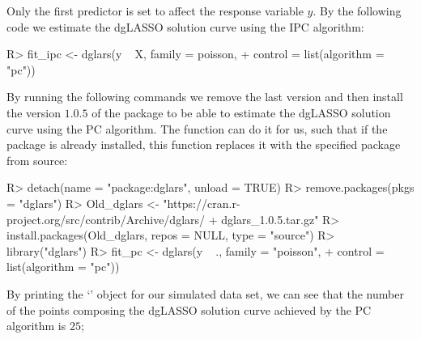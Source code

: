 
Only the first predictor is set to affect the response variable $y$. By the following code we estimate the dgLASSO solution curve using the IPC algorithm:

\begin{example}
R> fit_ipc <- dglars(y ~ X, family = poisson, 
+                    control = list(algorithm =  "pc"))
\end{example}

By running the following commands we remove the last version and then install the version $1.0.5$ of the package to be able to estimate the dgLASSO solution curve using the PC algorithm. The function  can do it for us, such that if the package is already installed, this function replaces it with the specified package from source:


\begin{example}
R> detach(name = "package:dglars", unload = TRUE)
R> remove.packages(pkgs = "dglars")
R> Old_dglars <- "https://cran.r-project.org/src/contrib/Archive/dglars/
+                dglars_1.0.5.tar.gz"
R> install.packages(Old_dglars, repos = NULL, type = "source")
R> library("dglars")
R> fit_pc <- dglars(y ~ ., family = "poisson", 
+                   control =  list(algorithm = "pc"))
\end{example}

By printing the `' object  for our simulated data set, we can see that the number of the points composing the dgLASSO solution curve achieved by the PC algorithm is $25$;


